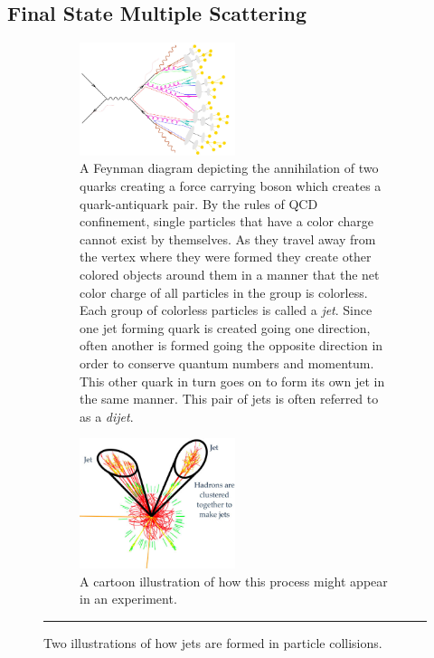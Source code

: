 \subsection{Final State Multiple Scattering}
\begin{figure}[hbtp!]
\centering   
\begin{subfigure}[]{1\textwidth}\captionsetup{width=1.1\linewidth}
    \centering
    \includegraphics[width=0.5\textwidth]{Figures/jetfeynman.jpg}
\caption{A Feynman diagram \citep{jetfeynmancredit} depicting the annihilation of two quarks creating a force carrying boson which creates a quark-antiquark pair. By the rules of QCD confinement, single particles that have a color charge cannot exist by themselves. As they travel away from the vertex where they were formed they create other colored objects around them in a manner that the net color charge of all particles in the group is colorless. Each group of colorless particles is called a \textit{jet}. Since one jet forming quark is created going one direction, often another is formed going the opposite direction in order to conserve quantum numbers and momentum. This other quark in turn goes on to form its own jet in the same manner. This pair of jets is often referred to as a \textit{dijet}.}
\label{fig:jetfeynman}
\end{subfigure}
\begin{subfigure}[]{1\textwidth}
\captionsetup{width=1.5\linewidth}
    \centering
    \includegraphics[width=0.5\textwidth]{Figures/jetdiagram.jpg}
\caption{A cartoon illustration \citep{jetdiagramcredit} of how this process might appear in an experiment.}
\label{fig:jetdiagram}
\end{subfigure} \rule{35em}{0.5pt}
\caption[Feynman and Cartoon diagrams of Jet Formation]{Two illustrations of how jets are formed in particle collisions.}
\label{fig:jetformation}    
\end{figure}
